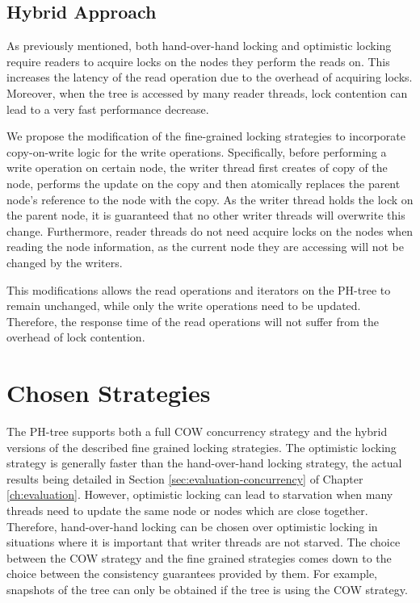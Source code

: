\documentclass[11pt,a4paper]{globis-book}
\begin{document}
\subsection{Hybrid Approach}
As previously mentioned, both hand-over-hand locking and optimistic locking require readers to acquire locks on the nodes they perform the reads on. This increases the latency of the read operation due to the overhead of acquiring locks. Moreover, when the tree is accessed by many reader threads, lock contention can lead to a very fast performance decrease. 

We propose the modification of the fine-grained locking strategies to incorporate copy-on-write logic for the write operations. Specifically, before performing a write operation on certain node, the writer thread first creates of copy of the node, performs the update on the copy and then atomically replaces the parent node's reference to the node with the copy. As the writer thread holds the lock on the parent node, it is guaranteed that no other writer threads will overwrite this change. Furthermore, reader threads do not need acquire locks on the nodes when reading the node information, as the current node they are accessing will not be changed by the writers. 

This modifications allows the read operations and iterators on the PH-tree to remain unchanged, while only the write operations need to be updated. Therefore, the response time of the read operations will not suffer from the overhead of lock contention. 

\section{Chosen Strategies}
The PH-tree supports both a full COW concurrency strategy and the hybrid versions of the described fine grained locking strategies. The optimistic locking strategy is generally faster than the hand-over-hand locking strategy, the actual results being detailed in Section \ref{sec:evaluation-concurrency} of Chapter \ref{ch:evaluation}. However, optimistic locking can lead to starvation when many threads need to update the same node or nodes which are close together. Therefore, hand-over-hand locking can be chosen over optimistic locking in situations where it is important that writer threads are not starved. The choice between the COW strategy and the fine grained strategies comes down to the choice between the consistency guarantees provided by them. For example, snapshots of the tree can only be obtained if the tree is using the COW strategy. 
\end{document}
